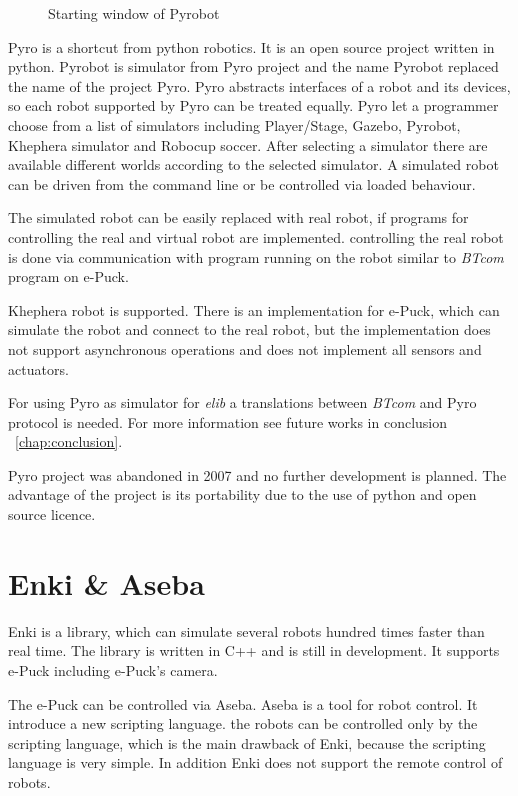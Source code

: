 \begin{figure}[hbp]
\begin{picture}
    \end{picture}%
  \fi
  \caption{\label{pic:pyrobot_win}%
   Starting window of Pyrobot}
  \end{figure}



  Pyro is a shortcut from python robotics. It is an open source project written in python. Pyrobot is simulator
  from Pyro project and the name Pyrobot replaced the name of the project Pyro. 
  Pyro abstracts interfaces of a robot and
  its devices, so each robot supported by Pyro can be treated equally.
  Pyro let a programmer choose from a list of simulators including Player/Stage, Gazebo, Pyrobot, Khephera simulator
  and Robocup soccer.
  After selecting a simulator there are available different worlds according to the selected simulator.
  A simulated robot can be driven from the command line or be controlled via loaded behaviour.
  
  The simulated robot can be easily replaced with real robot, if programs for controlling the real 
  and virtual robot are implemented. 	
  controlling the real robot is done via communication with program running on the robot similar 
  to {\it BTcom} program on e-Puck.
  
  Khephera robot is supported. There is an implementation for e-Puck, which can simulate the robot
  and connect to the real robot, but the implementation does not support asynchronous operations and does 
  not implement all sensors and actuators.
  
  For using Pyro as simulator for {\it elib} a translations between {\it BTcom} and Pyro protocol is needed.
  For more information see future works in conclusion ~\ref{chap:conclusion}.	
  
  Pyro project was abandoned in 2007 and no further development is planned.
  The advantage of the project is its portability due to the use of python and open source licence.
\section{Enki \& Aseba\cite{enki}}
  Enki is a library, which can simulate several robots hundred times faster than real time.
  The library is written in C++ and is still in development. It supports e-Puck including e-Puck's camera. 
  
  The e-Puck can be controlled via Aseba. Aseba is a tool for robot control.
  It introduce a new scripting language. 
  the robots can be controlled only by the scripting language, which is the main
  drawback of Enki, because the scripting language is very simple.
  In addition Enki does not support the remote control of robots.
